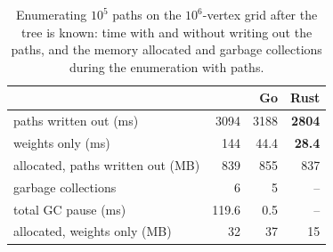\begin{table}[t]
\centering
\caption{Enumerating $10^5$ paths on the $10^6$-vertex grid after the tree is known: time with and without writing out the paths, and the memory allocated and garbage collections during the enumeration with paths.}
\label{tab:enumeration}
\small
\begin{tabular}{lrrr}
\toprule
 & \cs{} & Go & Rust \\
\midrule
paths written out (ms) & \num{3094} & \num{3188} & \textbf{\num{2804}} \\
weights only (ms) & \num{144} & 44.4 & \textbf{28.4} \\
\midrule
allocated, paths written out (MB) & 839 & 855 & 837 \\
garbage collections & 6 & 5 & -- \\
total GC pause (ms) & 119.6 & 0.5 & -- \\
allocated, weights only (MB) & 32 & 37 & 15 \\
\bottomrule
\end{tabular}
\end{table}
